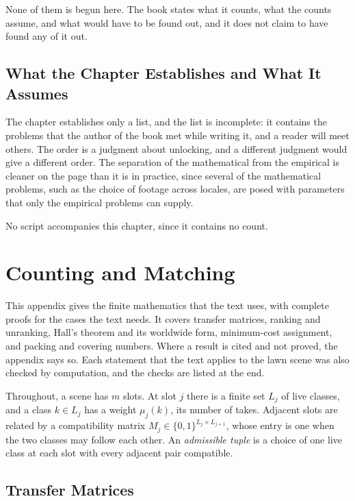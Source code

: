 \documentclass[11pt,twoside,openright]{book}
\theoremstyle{plain}
\theoremstyle{definition}
\theoremstyle{remark}
\begin{document}
None of them is begun here. The book states what it counts, what the counts assume, and what would have to be found out, and it does not claim to have found any of it out.

\section{What the Chapter Establishes and What It Assumes}\label{sec:limits18}

The chapter establishes only a list, and the list is incomplete: it contains the problems that the author of the book met while writing it, and a reader will meet others. The order is a judgment about unlocking, and a different judgment would give a different order. The separation of the mathematical from the empirical is cleaner on the page than it is in practice, since several of the mathematical problems, such as the choice of footage across locales, are posed with parameters that only the empirical problems can supply.

No script accompanies this chapter, since it contains no count.

\appendix

\chapter{Counting and Matching}
\label{app:counting}

This appendix gives the finite mathematics that the text uses, with complete proofs for the cases the text needs. It covers transfer matrices, ranking and unranking, Hall's theorem and its worldwide form, minimum-cost assignment, and packing and covering numbers. Where a result is cited and not proved, the appendix says so. Each statement that the text applies to the lawn scene was also checked by computation, and the checks are listed at the end.

Throughout, a scene has $m$ slots. At slot $j$ there is a finite set $L_j$ of live classes, and a class $k\in L_j$ has a weight $\mu_j(k)$, its number of takes. Adjacent slots are related by a compatibility matrix $M_j\in\{0,1\}^{L_j\times L_{j+1}}$, whose entry is one when the two classes may follow each other. An \emph{admissible tuple} is a choice of one live class at each slot with every adjacent pair compatible.

\section{Transfer Matrices}\label{sec:transfer}
\end{document}

